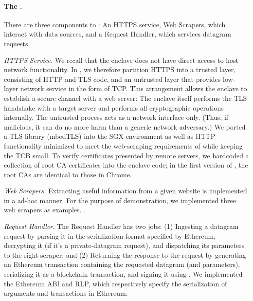 \paragraph{\bf The \encname.} There are three components to \engine: An HTTPS service, Web Scrapers, which interact with data sources, and a Request Handler, which services datagram requests. 

\vspace{2mm}

\noindent\emph{HTTPS Service.} We recall that the enclave does not have direct access to host network functionality. In \tc, we therefore partition HTTPS into a trusted layer, consisting of HTTP and TLS code, and an untrusted layer that provides low-layer network service in the form of TCP.  This arrangement allows the enclave to establish a secure channel with a web server: The enclave itself performs the TLS handshake with a target server and performs all cryptographic operations internally. The untrusted process acts as a network interface only. (Thus, if malicious, it can do no more harm than a generic network adversary.)  We ported a TLS library (mbedTLS) into the SGX environment as well as HTTP functionality minimized to meet the web-scraping requirements of \tc while keeping the TCB small. To verify certificates presented by remote servers, we hardcoded a collection of root CA certificates into the enclave code; in the first version of \tc, the root CAs are identical to those in Chrome.

\vspace{2mm}

\noindent\emph{Web Scrapers.} Extracting useful information from a given website is
implemented in a ad-hoc manner. For the purpose of demonstration, we implemented
three web scrapers as examples. .

\vspace{2mm}

\noindent\emph{Request Handler.} The Request Handler has two jobs: (1) Ingesting a datagram request by parsing 
it in the serialization format specified by Ethereum, decrypting it (if it's a private-datagram request), and dispatching its parameters to the right scraper; and (2) Returning the response to the request by generating an Ethereum
transaction containing the requested datagram (and parameters), serializing it as a blockchain transaction, and signing it using \skTC. We implemented the Ethereum ABI and RLP, which respectively
specify the serialization of arguments and transactions in Ethereum. 

